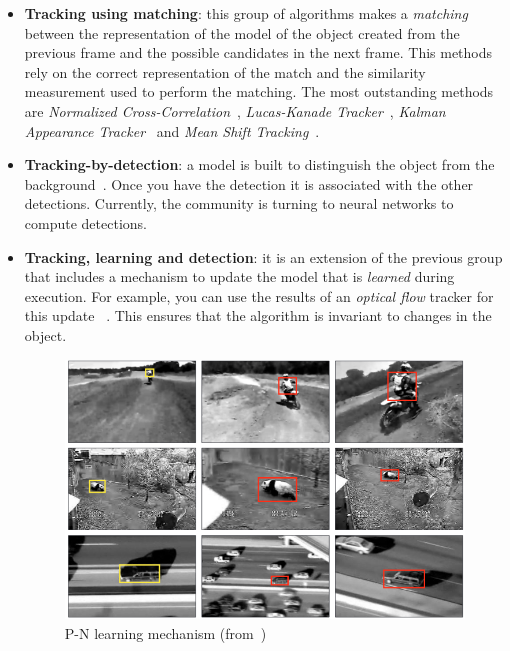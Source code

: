 \begin{itemize}
\item \textbf{Tracking using matching}: this group of algorithms makes a \textit {matching} between the representation of the model of the object created from the previous frame and the possible candidates in the next frame. This methods rely on the correct representation of the match and the similarity measurement used to perform the matching. The most outstanding methods are \textit{Normalized Cross-Correlation}~\cite{briechle2001template}, \textit{Lucas-Kanade Tracker}~\cite {baker2004lucas}, \textit{Kalman Appearance Tracker}~\cite{nguyen2004fast} and \textit{Mean Shift Tracking}~\cite{comaniciu2000real}.
\item \textbf{Tracking-by-detection}: a model is built to distinguish the object from the background~\cite{nguyen2006robust}. Once you have the detection it is associated with the other detections. Currently, the community is turning to neural networks to compute detections.
\item \textbf{Tracking, learning and detection}: it is an extension of the previous group that includes a mechanism to update the model that is \textit{learned} during execution. For example, you can use the results of an \textit{optical flow} tracker for this update ~\cite{kalal2010pn}. This ensures that the algorithm is invariant to changes in the object.
\begin{figure}[H]
\begin{center}
\includegraphics[scale=0.3]{figures/pn_learning.png}
\caption{P-N learning mechanism (from~\cite{kalal2010pn})}
\label{fig:pn}
\end{center}
\end{figure}
\end{itemize}
